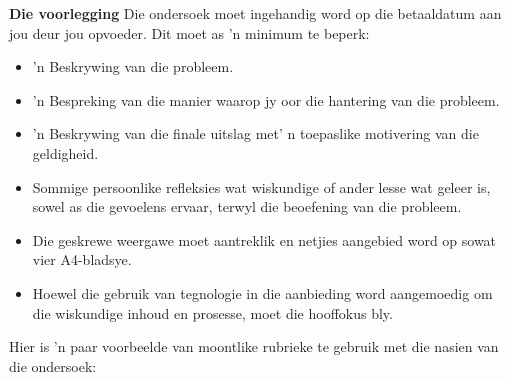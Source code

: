 \textbf{Die voorlegging}
Die ondersoek moet ingehandig word op die betaaldatum aan jou deur jou opvoeder. Dit moet as 'n minimum te beperk:
\begin{itemize}[noitemsep]
\item
  'n Beskrywing van die probleem.
\item
  'n Bespreking van die manier waarop jy oor die hantering van die probleem.
\item
  'n Beskrywing van die finale uitslag met' n toepaslike motivering van die geldigheid.
\item
  Sommige persoonlike refleksies wat wiskundige of ander lesse wat geleer is, sowel as die gevoelens ervaar, terwyl die beoefening van die probleem.
\item
  Die geskrewe weergawe moet aantreklik en netjies aangebied word op sowat vier A4-bladsye.
\item
  Hoewel die gebruik van tegnologie in die aanbieding word aangemoedig om die wiskundige inhoud en prosesse, moet die hooffokus bly.
\end{itemize}	
Hier is 'n paar voorbeelde van moontlike rubrieke te gebruik met die nasien van die ondersoek:

